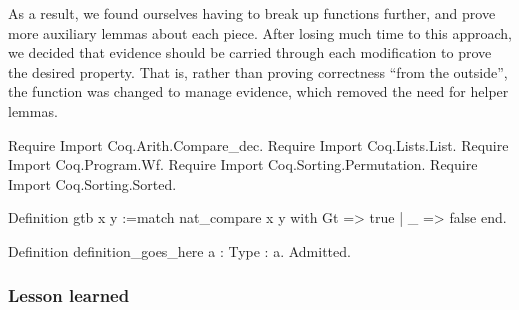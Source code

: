 \documentclass{llncs}
\begin{document}
As a result, we found ourselves having to break up functions further, and
prove more auxiliary lemmas about each piece.  After losing much time to this
approach, we decided that evidence should be carried through each modification
to prove the desired property.  That is, rather than proving correctness
``from the outside'', the function was changed to manage evidence, which
removed the need for helper lemmas.

% 


\begin{MyCoqEval}
Require Import Coq.Arith.Compare_dec.
Require Import Coq.Lists.List.
Require Import Coq.Program.Wf.
Require Import Coq.Sorting.Permutation.
Require Import Coq.Sorting.Sorted.

Definition gtb x y :=match nat_compare x y with Gt => true | _ => false end.

Definition definition_goes_here {a : Type} : a. Admitted.
\end{MyCoqEval}

\subsubsection*{Lesson learned}
\end{document}
